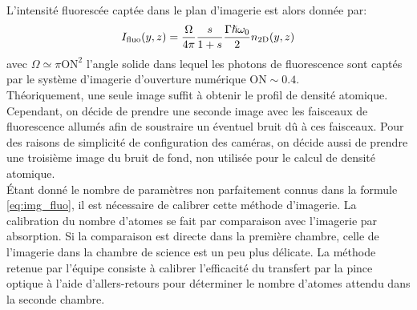 L'intensité fluorescée captée dans le plan d'imagerie est alors donnée par:
\begin{equation}
I_{\mathrm{fluo}}(y,z)=\frac{\Omega}{4\pi} \frac{s}{1+s} \frac{ \Gamma \hslash \omega_0}{2} n_{\mathrm{2D}}(y,z)
\label{eq:img_fluo}
\end{equation}
avec $\Omega \simeq \pi \mathrm{ON}^2$ l'angle solide dans lequel les photons de fluorescence sont captés par le système d'imagerie d'ouverture numérique $\mathrm{ON}\sim 0.4$. \\
Théoriquement, une seule image suffit à obtenir le profil de densité atomique. Cependant, on décide de prendre une seconde image avec les faisceaux de fluorescence allumés afin de soustraire un éventuel bruit dû à ces faisceaux. Pour des raisons de simplicité de configuration des caméras, on décide aussi de prendre une troisième image du bruit de fond, non utilisée pour le calcul de densité atomique.\\
Étant donné le nombre de paramètres non parfaitement connus dans la formule \ref{eq:img_fluo}, il est nécessaire de calibrer cette méthode d'imagerie. La calibration du nombre d'atomes se fait par comparaison avec l'imagerie par absorption. Si la comparaison est directe dans la première chambre, celle de l'imagerie dans la chambre de science est un peu plus délicate. La méthode retenue par l'équipe consiste à calibrer l'efficacité du transfert par la pince optique à l'aide d'allers-retours pour déterminer le nombre d'atomes attendu dans la seconde chambre.


